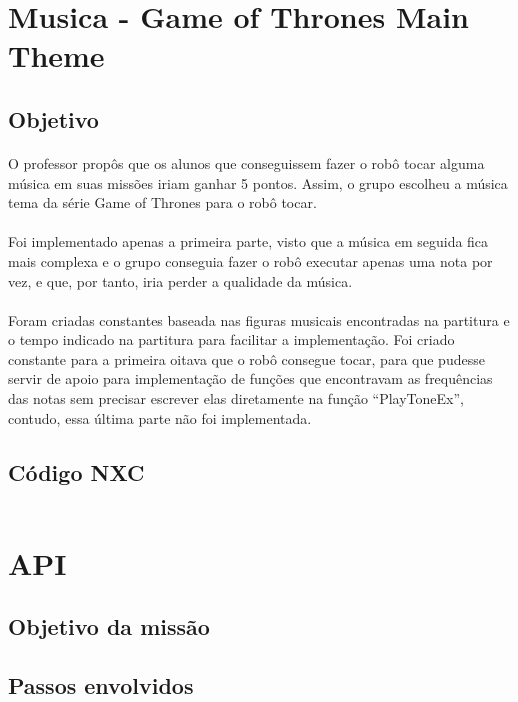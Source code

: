 \documentclass{article}
\begin{document}
\newpage
\section{Musica - Game of Thrones Main Theme}
	\subsection{Objetivo}
		\paragraph{}
			O professor propôs que os alunos que conseguissem fazer o robô tocar alguma música em suas missões iriam ganhar 5 pontos. Assim, o grupo escolheu a música tema da série Game of Thrones para o robô tocar.
		\paragraph{}
			Foi implementado apenas a primeira parte, visto que a música em seguida fica mais complexa e o grupo conseguia fazer o robô executar apenas uma nota por vez, e que, por tanto, iria perder a qualidade da música.
		\paragraph{}
			Foram criadas constantes baseada nas figuras musicais encontradas na partitura e o tempo indicado na partitura para facilitar a implementação. Foi criado constante para a primeira oitava que o robô consegue tocar, para que pudesse servir de apoio para implementação de funções que encontravam as frequências das notas sem precisar escrever elas diretamente na função “PlayToneEx”, contudo, essa última parte não foi implementada.

	\subsection{Código NXC}
		\inputminted[linenos, frame = single]{c}{../GameOfThrones.nxc}

\newpage
\section{API}
	\subsection{Objetivo da missão}
	\subsection{Passos envolvidos}
\end{document}
